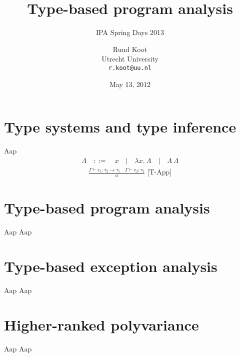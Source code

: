 \documentclass{beamer}
\newcommand{\Rule}[3]{\frac{#2}{#3}\mbox{\ [#1]}}
\newcommand{\JudgeT}[3][\Gamma]{#1 \vdash #2 : #3}
\begin{document}

\title{Type-based program analysis}
\subtitle{IPA Spring Days 2013}
\author{Ruud Koot\\Utrecht University\\\texttt{r.koot@uu.nl}}
\date{May 13, 2012}
\maketitle

\section{Type systems and type inference} %

\begin{frame}{Aap}
\begin{align*}
\Lambda \quad ::= \quad x
        \quad  |  \quad \lambda x.\ \Lambda
        \quad  |  \quad \Lambda\ \Lambda
\end{align*}
\begin{align*}
\Rule{T-App}
     {\JudgeT{e_1}{\tau_2 \to \tau_1} \quad \JudgeT{e_2}{\tau_2}}
     {a}
\end{align*}
\end{frame}

\section{Type-based program analysis}

\begin{frame}{Aap}
Aap
\end{frame}

\section{Type-based exception analysis}

\begin{frame}{Aap}
Aap
\end{frame}

\section{Higher-ranked polyvariance}

\begin{frame}{Aap}
Aap
\end{frame}
\end{document}
